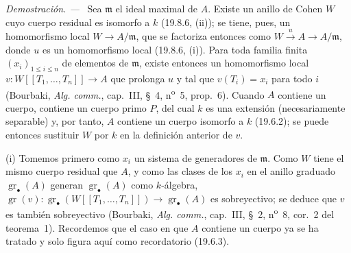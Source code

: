 \documentclass[10pt,oneside]{book}
\newcommand{\gr}{\operatorname{gr}}
\newenvironment{proof}{%
  \par\medskip\noindent\textit{Demostración. ---\ }}{\par}
\begin{document}
\begin{proof}
Sea $\mathfrak m$ el ideal maximal de $A$. Existe un anillo de Cohen $W$ cuyo
cuerpo residual es isomorfo a $k$ (19.8.6, (ii)); se tiene, pues, un
homomorfismo local $W\to A/\mathfrak m$, que se factoriza entonces como
$W\xrightarrow{u}A\to A/\mathfrak m$, donde $u$ es un homomorfismo local
(19.8.6, (i)). Para toda familia finita $(x_i)_{1\leq i\leq n}$ de elementos
de $\mathfrak m$, existe entonces un homomorfismo local
$v:W[[T_1,\ldots,T_n]]\to A$ que prolonga $u$ y tal que $v(T_i)=x_i$ para todo
$i$ (Bourbaki, \emph{Alg. comm.}, cap.~III, §~4, n\textsuperscript{o}~5,
prop.~6). Cuando $A$ contiene un cuerpo, contiene un cuerpo primo $P$, del cual
$k$ es una extensión (necesariamente separable) y, por tanto, $A$ contiene un
cuerpo isomorfo a $k$ (19.6.2); se puede entonces sustituir $W$ por $k$ en la
definición anterior de $v$.

\medskip
\noindent(i)\enspace
Tomemos primero como $x_i$ un sistema de generadores de $\mathfrak m$. Como
$W$ tiene el mismo cuerpo residual que $A$, y como las clases de los $x_i$ en
el anillo graduado $\gr_\bullet(A)$ generan $\gr_\bullet(A)$ como $k$-álgebra,
$\gr(v):\gr_\bullet(W[[T_1,\ldots,T_n]])\to\gr_\bullet(A)$ es sobreyectivo;
se deduce que $v$ es también sobreyectivo (Bourbaki, \emph{Alg. comm.},
cap.~III, §~2, n\textsuperscript{o}~8, cor.~2 del teorema~1). Recordemos que el
caso en que $A$ contiene un cuerpo ya se ha tratado y solo figura aquí como
recordatorio (19.6.3).


\end{proof}
\end{document}
